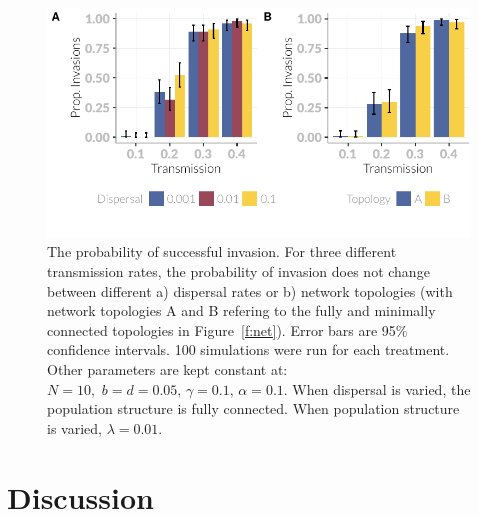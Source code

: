 \begin{knitrout}\footnotesize
{}\color{fgcolor}\begin{figure}[t]

{\centering \includegraphics[width=\textwidth]{figure/invasionPropPlots-1} 

}

\caption[The probability of invasion across different dispersal rates and network topologies.]{The probability of successful invasion. 
  For three different transmission rates, the probability of invasion does not change between different a) dispersal rates or b) network topologies (with network topologies A and B refering to the    fully and minimally connected topologies in Figure~\ref{f:net}). 
  Error bars are 95\% confidence intervals. 
  100 simulations were run for each treatment.
  Other parameters are kept constant at: $N = 10,\, \, b = d = 0.05,\, \gamma = 0.1,\, \alpha = 0.1$. 
  When dispersal is varied, the population structure is fully connected. When population structure is varied, $\lambda = 0.01$.}\label{f:invasionPropPlots}
\end{figure}


\end{knitrout}






\section{Discussion}


